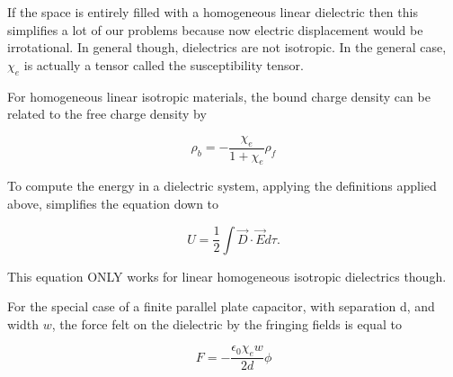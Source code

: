 \documentclass[preprint, review,12pt]{elsarticle}
\begin{document}
If the space is entirely filled with a homogeneous linear dielectric then this simplifies a lot of our problems because now electric displacement would be irrotational. In general though, dielectrics are not isotropic. In the general case, $\chi_e$ is actually a tensor called the susceptibility tensor. 

For homogeneous linear isotropic materials, the bound charge density can be related to the free charge density by

\begin{equation}
    \rho_b = - \frac{\chi_e}{1+\chi_e}\rho_f
\end{equation}

To compute the energy in a dielectric system, applying the definitions applied above, simplifies the equation down to

\begin{equation}
    U = \frac{1}{2}\int \vec{D}\cdot \vec{E}d\tau.
\end{equation}

This equation ONLY works for linear homogeneous isotropic dielectrics though.

For the special case of a finite parallel plate capacitor, with separation d, and width $w$, the force felt on the dielectric by the fringing fields is equal to 

\begin{equation}
    F = -\frac{\epsilon_0\chi_ew}{2d}\phi
\end{equation}
































\end{document}

